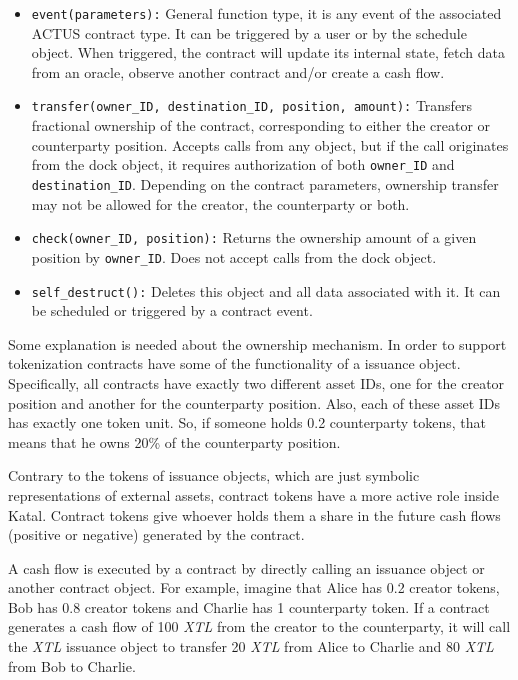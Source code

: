 \documentclass[conference]{IEEEtran}
\begin{document}
\begin{itemize}
	\item \texttt{event(parameters):} General function type, it is any event of the associated ACTUS contract type. It can be triggered by a user or by the schedule object. When triggered, the contract will update its internal state, fetch data from an oracle, observe another contract and/or create a cash flow.
	\item \texttt{transfer(owner\_ID, destination\_ID, position, amount):} Transfers fractional ownership of the contract, corresponding to either the creator or counterparty position. Accepts calls from any object, but if the call originates from the dock object, it requires authorization of both \texttt{owner\_ID} and \texttt{destination\_ID}. Depending on the contract parameters, ownership transfer may not be allowed for the creator, the counterparty or both.
	\item \texttt{check(owner\_ID, position):} Returns the ownership amount of a given position by \texttt{owner\_ID}. Does not accept calls from the dock object.
	\item \texttt{self\_destruct():} Deletes this object and all data associated with it. It can be scheduled or triggered by a contract event.
\end{itemize}

Some explanation is needed about the ownership mechanism. In order to support tokenization contracts have some of the functionality of a issuance object. Specifically, all contracts have exactly two different asset IDs, one for the creator position and another for the counterparty position. Also, each of these asset IDs has exactly one token unit. So, if someone holds 0.2 counterparty tokens, that means that he owns 20\% of the counterparty position.

Contrary to the tokens of issuance objects, which are just symbolic representations of external assets, contract tokens have a more active role inside Katal. Contract tokens give whoever holds them a share in the future cash flows (positive or negative) generated by the contract.

A cash flow is executed by a contract by directly calling an issuance object or another contract object. For example, imagine that Alice has 0.2 creator tokens, Bob has 0.8 creator tokens and Charlie has 1 counterparty token. If a contract generates a cash flow of 100 \textit{XTL} from the creator to the counterparty, it will call the \textit{XTL} issuance object to transfer 20 \textit{XTL} from Alice to Charlie and 80 \textit{XTL} from Bob to Charlie.
\end{document}
